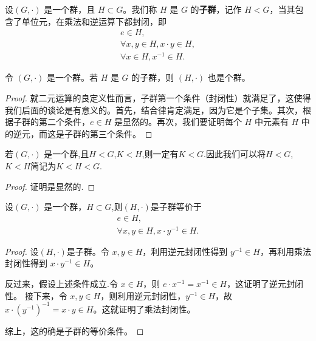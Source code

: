 \documentclass[../../main.tex]{subfiles}
\begin{document}
\begin{definition}[子群]
设$(G, \cdot)$ 是一个群，且 $H \subset G$。我们称 $H$ 是 $G$ 的\textbf{子群}，记作 $H < G$，当其包含了单位元，在乘法和逆运算下都封闭，即
\begin{gather*}
e \in H ,\\
\forall x, y \in H, x \cdot y \in H ,\\
\forall x \in H, x^{-1} \in H.
\end{gather*} 
\end{definition}

\begin{proposition}[子群也是群]
令 $(G, \cdot)$ 是一个群。若 $H$ 是 $G$ 的子群，则 $(H, \cdot)$ 也是个群。
\end{proposition}
\begin{proof}
就二元运算的良定义性而言，子群第一个条件（封闭性）就满足了，这使得我们后面的谈论是有意义的。首先，结合律肯定满足，因为它是个子集。其次，根据子群的第二个条件，$e \in H$ 是显然的。再次，我们要证明每个 $H$ 中元素有 $H$ 中的逆元，而这是子群的第三个条件。
\end{proof}

\begin{corollary}[子群的传递性]
若$(G, \cdot)$ 是一个群,且$H<G$,$K<H$,则一定有$K<G$.因此我们可以将$H<G$,$K<H$简记为$K<H<G$.
\end{corollary}
\begin{proof}
证明是显然的.
\end{proof}

\begin{proposition}[子群的等价条件]\label{proposition:子群的等价条件}
设$(G, \cdot)$ 是一个群，$H\subset G$,则$(H,\cdot)$是子群等价于
\begin{gather*}
e \in H,\\
\forall x, y \in H, x \cdot y^{-1} \in H .
\end{gather*}
\end{proposition}
\begin{proof}
设$(H,\cdot)$是子群。令 $x, y \in H$，利用逆元封闭性得到 $y^{-1} \in H$，再利用乘法封闭性得到 $x \cdot y^{-1} \in H$。

反过来，假设上述条件成立.令 $x \in H$，则 $e \cdot x^{-1} = x^{-1} \in H$，这证明了逆元封闭性。
接下来，令 $x, y \in H$，则利用逆元封闭性，$y^{-1} \in H$，故 $x \cdot (y^{-1})^{-1} = x \cdot y \in H$。这就证明了乘法封闭性。

综上，这的确是子群的等价条件。
\end{proof}
\end{document}
